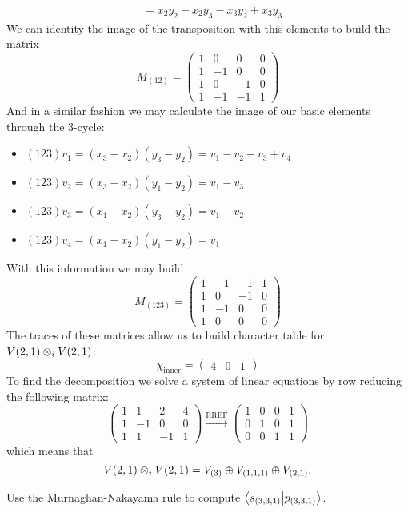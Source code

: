 \documentclass[12pt]{memoir}
\begin{document}
\begin{ptcbr}
\begin{align*}
    &=x_2y_2-x_2y_3-x_3y_2+x_3y_3
    \end{align*} 
We can identity the image of the transposition with this elements to build the matrix 
$$M_{(12)}=\begin{pmatrix}
    1&0&0&0\\1&-1&0&0\\1&0&-1&0\\1&-1&-1&1
\end{pmatrix}$$
And in a similar fashion we may calculate the image of our basic elements through the $3$-cycle:
\begin{itemize}
    \item $(123)v_1=(x_3-x_2)(y_3-y_2)=v_1-v_2-v_3+v_4$
    \item $(123)v_2=(x_3-x_2)(y_1-y_2)=v_1-v_3$
    \item $(123)v_3=(x_1-x_2)(y_3-y_2)=v_1-v_2$
    \item $(123)v_4=(x_1-x_2)(y_1-y_2)=v_1$
\end{itemize}
With this information we may build
$$M_{(123)}=\begin{pmatrix}
    1&-1&-1&1\\1&0&-1&0\\1&-1&0&0\\1&0&0&0
\end{pmatrix}$$
The traces of these matrices allow us to build character table for $V(2,1)\otimes_i V(2,1)$:
    $$\chi_{\text{inner}}=\begin{pmatrix}
        4&0&1
    \end{pmatrix}$$
To find the decomposition we solve a system of linear equations by row reducing the following matrix:
$$\begin{pmatrix}
    1&1&2&4\\1&-1&0&0\\1&1&-1&1
\end{pmatrix}\xrightarrow[]{\text{RREF}}\begin{pmatrix}
    1&0&0&1\\0&1&0&1\\0&0&1&1
\end{pmatrix}$$
which means that
$$V(2,1)\otimes_i V(2,1)=V_{(3)}\oplus V_{(1,1,1)}\oplus V_{(2,1)}.$$
\end{ptcbr}

\begin{Ej}[Exercise 6]
    Use the Murnaghan-Nakayama rule to compute $\braket{s_{(3,3,1)}}{p_{(3,3,1)}}$.
\end{Ej}
\end{document}
